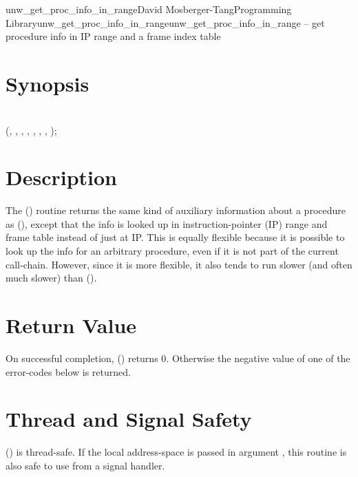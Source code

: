 \documentclass{article}
\begin{document}
\begin{Name}{3}{unw\_get\_proc\_info\_in\_range}{David Mosberger-Tang}{Programming Library}{unw\_get\_proc\_info\_in\_range}unw\_get\_proc\_info\_in\_range -- get procedure info in IP range and a frame index table
\end{Name}

\section{Synopsis}

\\

 (, , , , , , , );\\

\section{Description}

The () routine returns the same
kind of auxiliary information about a procedure as
(), except that the info is looked up in
instruction-pointer (IP) range and frame table instead of just at IP.  This
is equally flexible because it is possible to look up the info for an arbitrary
procedure, even if it is not part of the current call-chain.  However, since it
is more flexible, it also tends to run slower (and often much slower)
than ().

\section{Return Value}

On successful completion, ()
returns 0.  Otherwise the negative value of one of the error-codes
below is returned.

\section{Thread and Signal Safety}

() is thread-safe.  If the local
address-space is passed in argument , this routine is also
safe to use from a signal handler.
\end{document}
